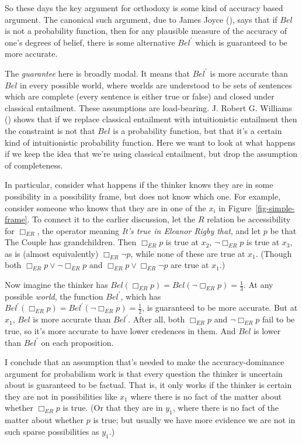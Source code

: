 \documentclass[
  11pt,
  letterpaper,
  DIV=11,
  numbers=noendperiod,
  twoside]{scrartcl}
\newcounter{none} %
\begin{document}
So these days the key argument for orthodoxy is some kind of accuracy
based argument. The canonical such argument, due to James Joyce
(), says that if \(Bel\) is not a
probability function, then for any plausible measure of the accuracy of
one's degrees of belief, there is some alternative \(Bel^\prime\) which
is guaranteed to be more accurate.

The \emph{guarantee} here is broadly modal. It means that \(Bel^\prime\)
is more accurate than \(Bel\) in every possible world, where worlds are
understood to be sets of sentences which are complete (every sentence is
either true or false) and closed under classical entailment. These
assumptions are load-bearing. J. Robert G. Williams
() shows that if we replace
classical entailment with intuitionistic entailment then the constraint
is not that \(Bel\) is a probability function, but that it's a certain
kind of intuitionistic probability function. Here we want to look at
what happens if we keep the idea that we're using classical entailment,
but drop the assumption of completeness.

In particular, consider what happens if the thinker knows they are in
some possibility in a possibility frame, but does not know which one.
For example, consider someone who knows that they are in one of the
\(x_i\) in Figure~\ref{fig-simple-frame}. To connect it to the earlier
discussion, let the \(R\) relation be accessibility for \(\Box_{ER}\),
the operator meaning \emph{It's true in Eleanor Rigby that}, and let
\(p\) be that The Couple has grandchildren. Then \(\Box_{ER} p\) is true
at \(x_2\), \(\neg \Box_{ER} p\) is true at \(x_3\), as is (almost
equivalently) \(\Box_{ER} \neg p\), while none of these are true at
\(x_1\). (Though both \(\Box_{ER} p \vee \neg \Box_{ER} p\) and
\(\Box_{ER} p \vee \Box_{ER} \neg p\) are true at \(x_1\).)

Now imagine the thinker has
\(Bel(\Box_{ER} p) = Bel(\neg \Box_{ER} p) = \frac{1}{3}\). At any
possible \emph{world}, the function \(Bel^\prime\), which has
\(Bel^\prime(\Box_{ER} p) = Bel^\prime(\neg \Box_{ER} p) = \frac{1}{2}\),
is guaranteed to be more accurate. But at \(x_1\), \(Bel\) is more
accurate than \(Bel^\prime\). After all, both \(\Box_{ER} p\) and
\(\neg \Box_{ER} p\) fail to be true, so it's more accurate to have
lower credences in them. And \(Bel\) is lower than \(Bel^\prime\) on
each proposition.

I conclude that an assumption that's needed to make the
accuracy-dominance argument for probabilism work is that every question
the thinker is uncertain about is guaranteed to be factual. That is, it
only works if the thinker is certain they are not in possibilities like
\(x_1\) where there is no fact of the matter about whether
\(\Box_{ER} p\) is true. (Or that they are in \(y_1\), where there is no
fact of the matter about whether \(p\) is true; but usually we have more
evidence we are not in such sparse possibilities as \(y_1\).)
\end{document}

